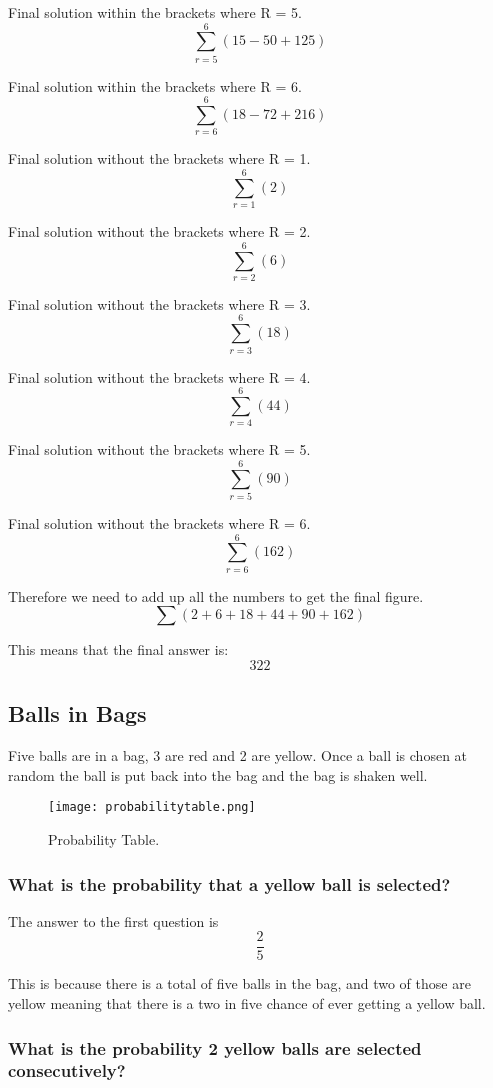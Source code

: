 \documentclass[a4paper,12pt]{article}
\begin{document}
Final solution within the brackets where R = 5.
$$\sum^6_{r=5} (15 - 50 + 125)$$

Final solution within the brackets where R = 6.
$$\sum^6_{r=6} (18 - 72 + 216)$$

\newpage

Final solution without the brackets where R = 1.
$$\sum^6_{r=1} (2)$$

Final solution without the brackets where R = 2.
$$\sum^6_{r=2} (6)$$

Final solution without the brackets where R = 3.
$$\sum^6_{r=3} (18)$$

Final solution without the brackets where R = 4.
$$\sum^6_{r=4} (44)$$

Final solution without the brackets where R = 5.
$$\sum^6_{r=5} (90)$$

Final solution without the brackets where R = 6.
$$\sum^6_{r=6} (162)$$

\newpage

Therefore we need to add up all the numbers to get the final figure.
$$\sum (2 + 6 + 18 + 44 + 90 + 162)$$

This means that the final answer is:
$$322$$

\newpage

\subsection{Balls in Bags}

Five balls are in a bag, 3 are red and 2 are yellow. Once a ball is chosen at random the ball is put back into the bag and the bag is shaken well.

\begin{figure}[h!]
  \texttt{[image: probabilitytable.png]}
  \caption{Probability Table.}
  \label{fig:chart1}
\end{figure}

\newpage

\subsubsection{What is the probability that a yellow ball is selected?}

The answer to the first question is $$\frac{2}{5}$$

This is because there is a total of five balls in the bag, and two of those are yellow meaning that there is a two in five chance of ever getting a yellow ball.

\subsubsection{What is the probability 2 yellow balls are selected consecutively?}
\end{document}
